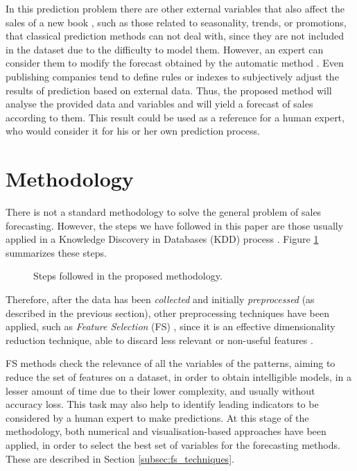 \documentclass[a4paper,10pt,twocolumn,preprint,3p]{elsarticle}
\begin{document}
In this prediction problem there are other external variables that also affect 
the sales of a new book \cite{Little1998}, such as those related to seasonality, trends, or promotions, that classical prediction methods can not deal with, since they are not included in the dataset due to the difficulty to model them. 
However, an expert can consider them to modify the forecast obtained by 
the automatic method \cite{Armstrong2001}. Even publishing companies tend to define rules or  indexes to subjectively adjust the results of prediction based on external data. 
Thus, the proposed method will analyse the provided data and
variables and will yield a forecast of sales according to them. This
result could be used as a reference for a human expert, who would
consider it for his or her own prediction process. 


\section{Methodology}
\label{sec:methodology}

There is not a standard methodology to solve the general problem of sales forecasting. However, the steps we have followed in this paper are those usually applied in a Knowledge Discovery in Databases (KDD) process \cite{fayyad1996data}. Figure \ref{fig:methodology} summarizes these steps.

\begin{figure}[!ht] 
\begin{center}
\caption{Steps followed in the proposed methodology.}
\label{fig:methodology}
\end{center}
\end{figure}


Therefore, after the data has been \textit{collected} and initially \textit{preprocessed} (as described in the previous section), other preprocessing techniques have been applied, such as \textit{Feature Selection} (FS) \cite{kittler1986feature}, since it is an effective dimensionality reduction technique, able to discard less relevant or non-useful features \cite{Krishnapuram2004,Chen2011_FS_PTS}.

FS methods check the relevance of all the variables of the patterns, aiming to reduce the set of features on a dataset, in order to obtain intelligible models, in a lesser amount of time due to their lower complexity, and usually without accuracy loss.
This task may also help to identify leading indicators to be considered 
by a human expert to make predictions.
At this stage of the methodology, both numerical and visualisation-based approaches have been applied, in order to select the best set of variables for the forecasting methods. These are described in Section \ref{subsec:fs_techniques}. 
\end{document}
